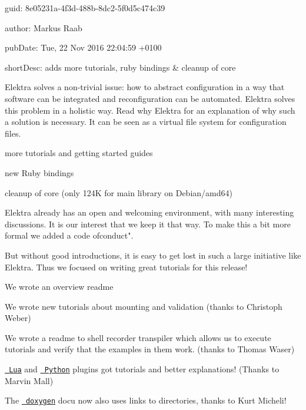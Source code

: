
\begin{DoxyItemize}
\item guid\+: 8e05231a-\/4f3d-\/488b-\/8dc2-\/5f0d5c474c39
\item author\+: Markus Raab
\item pub\+Date\+: Tue, 22 Nov 2016 22\+:04\+:59 +0100
\item short\+Desc\+: adds more tutorials, ruby bindings \& cleanup of core
\end{DoxyItemize}

Elektra solves a non-\/trivial issue\+: how to abstract configuration in a way that software can be integrated and reconfiguration can be automated. Elektra solves this problem in a holistic way. Read why Elektra for an explanation of why such a solution is necessary. It can be seen as a virtual file system for configuration files.


\begin{DoxyItemize}
\item more tutorials and getting started guides
\item new Ruby bindings
\item cleanup of core (only 124K for main library on Debian/amd64)
\end{DoxyItemize}

Elektra already has an open and welcoming environment, with many interesting discussions. It is our interest that we keep it that way. To make this a bit more formal we added a code ofconduct".

But without good introductions, it is easy to get lost in such a large initiative like Elektra. Thus we focused on writing great tutorials for this release!


\begin{DoxyItemize}
\item We wrote an overview readme
\item We wrote new tutorials about mounting and validation (thanks to Christoph Weber)
\item We wrote a readme to shell recorder transpiler which allows us to execute tutorials and verify that the examples in them work. (thanks to Thomas Waser)
\item \href{https://master.libelektra.org/src/plugins/lua}{\texttt{ Lua}} and \href{https://master.libelektra.org/src/plugins/python}{\texttt{ Python}} plugins got tutorials and better explanations! (Thanks to Marvin Mall)
\item The \href{https://doc.libelektra.org/api/0.8.19/html/}{\texttt{ doxygen}} docu now also uses links to directories, thanks to Kurt Micheli!
\end{DoxyItemize}

